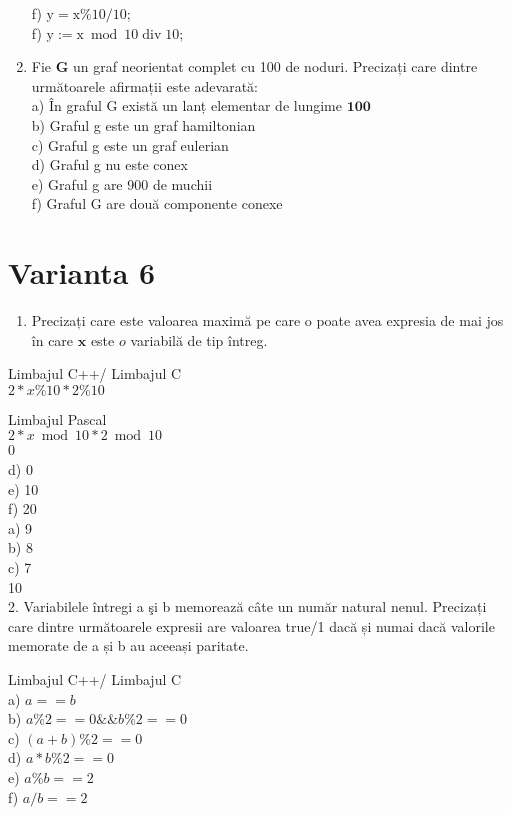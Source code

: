 \begin{enumerate}
f) $\mathrm{y}=\mathrm{x} \% 10 / 10$;\\
f) $\mathrm{y}:=\mathrm{x} \bmod 10 \operatorname{div} 10$;
  \item Fie $\mathbf{G}$ un graf neorientat complet cu 100 de noduri. Precizați care dintre următoarele afirmații este adevarată:\\
a) În graful G există un lanț elementar de lungime $\mathbf{1 0 0}$\\
b) Graful g este un graf hamiltonian\\
c) Graful g este un graf eulerian\\
d) Graful g nu este conex\\
e) Graful g are 900 de muchii\\
f) Graful G are două componente conexe
\end{enumerate}

\section*{Varianta 6}
\begin{enumerate}
  \item Precizați care este valoarea maximă pe care o poate avea expresia de mai jos în care $\mathbf{x}$ este $o$ variabilă de tip întreg.
\end{enumerate}

Limbajul C++/ Limbajul C\\
$2 * x \% 10 * 2 \% 10$

Limbajul Pascal\\
$2 * x \bmod 10 * 2 \bmod 10$\\
0\\
d) 0\\
e) 10\\
f) 20\\
a) 9\\
b) 8\\
c) 7\\
10\\
2. Variabilele întregi a şi b memorează câte un număr natural nenul. Precizați care dintre următoarele expresii are valoarea true/1 dacă și numai dacă valorile memorate de a și b au aceeași paritate.

Limbajul C++/ Limbajul C\\
a) $a==b$\\
b) $a \% 2==0 \& \& b \% 2==0$\\
c) $(a+b) \% 2==0$\\
d) $a * b \% 2==0$\\
e) $a \% b==2$\\
f) $a / b==2$

